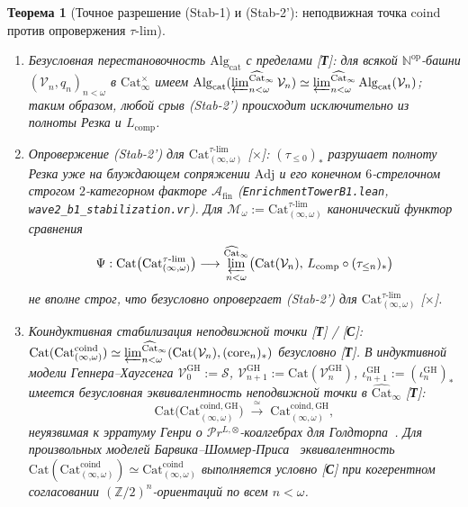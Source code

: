 \documentclass[11pt]{article}
\theoremstyle{plain}
\newtheorem{theorem}{Теорема}[section]
\theoremstyle{definition}
\newcommand{\Cat}{\mathrm{Cat}}
\begin{document}
\begin{theorem}[Точное разрешение \textup{(Stab-1)} и \textup{(Stab-2')}: неподвижная точка $\mathrm{coind}$ против опровержения $\tau\text{-}\mathrm{lim}$]\label{thm:b1-stab-resolution}
\begin{enumerate}[nosep,label=(\roman*)]
\item \emph{Безусловная перестановочность $\mathrm{Alg}_{\mathrm{cat}}$ с пределами \textup{[\textbf{Т}]}}: для всякой $\mathbb{N}^{\mathrm{op}}$-башни $(\mathcal{V}_n, q_n)_{n<\omega}$ в $\Cat_\infty^{\times}$ имеем $\mathrm{Alg}_{\mathrm{cat}}(\varprojlim_{n<\omega}^{\widehat{\Cat}_\infty} \mathcal{V}_n) \simeq \varprojlim_{n<\omega}^{\widehat{\Cat}_\infty} \mathrm{Alg}_{\mathrm{cat}}(\mathcal{V}_n)$; таким образом, любой срыв \textup{(Stab-2')} происходит исключительно из полноты Резка и $L_{\mathrm{comp}}$.
\item \emph{Опровержение \textup{(Stab-2')} для $\Cat_{(\infty,\omega)}^{\tau\text{-}\mathrm{lim}}$ \textup{[\textbf{$\times$}]}}: $(\tau_{\le 0})_*$ разрушает полноту Резка уже на блуждающем сопряжении $\mathrm{Adj}$ и его конечном $6$-стрелочном строгом $2$-категорном факторе $\mathcal{A}_{\mathrm{fin}}$ (\texttt{EnrichmentTowerB1.lean}, \texttt{wave2\_b1\_stabilization.vr}). Для $\mathcal{M}_\omega := \Cat_{(\infty,\omega)}^{\tau\text{-}\mathrm{lim}}$ канонический функтор сравнения
\[
  \Psi : \Cat\bigl(\Cat_{(\infty,\omega)}^{\tau\text{-}\mathrm{lim}}\bigr) \longrightarrow \varprojlim_{n < \omega}^{\widehat{\Cat}_\infty} \bigl(\Cat(\mathcal{V}_n),\, L_{\mathrm{comp}} \circ (\tau_{\le n})_*\bigr)
\]
\emph{не} вполне строг, что безусловно опровергает \textup{(Stab-2')} для $\Cat_{(\infty,\omega)}^{\tau\text{-}\mathrm{lim}}$ \textup{[\textbf{$\times$}]}.
\item \emph{Коиндуктивная стабилизация неподвижной точки \textup{[\textbf{Т}]} / \textup{[\textbf{С}]}}: $\Cat(\Cat_{(\infty,\omega)}^{\mathrm{coind}}) \simeq \varprojlim_{n<\omega}^{\widehat{\Cat}_\infty}(\Cat(\mathcal{V}_n), (\mathrm{core}_n)_*)$ безусловно \textup{[\textbf{Т}]}. В индуктивной модели Гепнера--Хаугсенга $\mathcal{V}_0^{\mathrm{GH}} := \mathcal{S}$, $\mathcal{V}_{n+1}^{\mathrm{GH}} := \Cat(\mathcal{V}_n^{\mathrm{GH}})$, $\iota_{n+1}^{\mathrm{GH}} := (\iota_n^{\mathrm{GH}})_*$ имеется безусловная эквивалентность неподвижной точки в $\widehat{\Cat}_\infty$ \textup{[\textbf{Т}]}:
\[
  \Cat\bigl(\Cat_{(\infty,\omega)}^{\mathrm{coind, GH}}\bigr) \;\xrightarrow{\;\simeq\;}\; \Cat_{(\infty,\omega)}^{\mathrm{coind, GH}},
\]
неуязвимая к эрратуму Генри о $\mathcal{P}r^{L,\otimes}$-коалгебрах для Голдторпа~\cite{Goldthorpe2023}. Для произвольных моделей Барвика--Шоммер-Приса~\cite{BarwickSchommerPries2021} эквивалентность $\Cat(\Cat_{(\infty,\omega)}^{\mathrm{coind}}) \simeq \Cat_{(\infty,\omega)}^{\mathrm{coind}}$ выполняется условно \textup{[\textbf{С}]} при когерентном согласовании $(\mathbb{Z}/2)^n$-ориентаций по всем $n < \omega$.

\end{enumerate}
\end{theorem}
\end{document}

